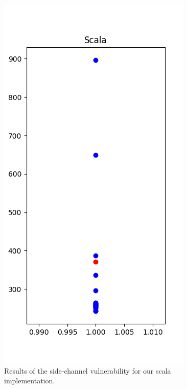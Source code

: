 \begin{figure}
\includegraphics[scale=1]{figures/scala.png}
\caption{Results of the side-channel vulnerability for our scala implementation.}
\end{figure}

